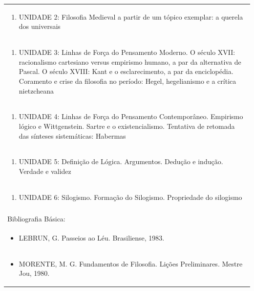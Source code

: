 \documentclass[11pt]{article}
\begin{document}
\begin{center}
\begin{longtable}{|p{4cm}|p{4cm}|p{4cm}|p{4cm}|}
\multicolumn{4}{|p{\dimexpr 16cm + 6\tabcolsep\relax}|}{\begin{enumerate}[start=2]\item UNIDADE 2: Filosofia Medieval a partir de um tópico exemplar: a querela dos universais\end{enumerate}}\\
\multicolumn{4}{|p{\dimexpr 16cm + 6\tabcolsep\relax}|}{\begin{enumerate}[start=3]\item UNIDADE 3: Linhas de Força do Pensamento Moderno. O século XVII: racionalismo cartesiano versus empirismo humano, a par da alternativa de Pascal. O século XVIII: Kant e o esclarecimento, a par da enciclopédia. Coramento e crise da filosofia no período: Hegel, hegelianismo e a crítica nietzcheana\end{enumerate}}\\
\multicolumn{4}{|p{\dimexpr 16cm + 6\tabcolsep\relax}|}{\begin{enumerate}[start=4]\item UNIDADE 4: Linhas de Força do Pensamento Contemporâneo. Empirismo lógico e Wittgenstein. Sartre e o existencialismo. Tentativa de retomada das sínteses sistemáticas: Habermas\end{enumerate}}\\
\multicolumn{4}{|p{\dimexpr 16cm + 6\tabcolsep\relax}|}{\begin{enumerate}[start=5]\item UNIDADE 5: Definição de Lógica. Argumentos. Dedução e indução. Verdade e validez\end{enumerate}}\\
\multicolumn{4}{|p{\dimexpr 16cm + 6\tabcolsep\relax}|}{\begin{enumerate}[start=6]\item UNIDADE 6: Silogismo. Formação do Silogismo. Propriedade do silogismo\end{enumerate}}\\
\multicolumn{4}{|p{\dimexpr 16cm + 6\tabcolsep\relax}|}{}\\
\hline
\multicolumn{4}{|p{16cm}|}{Bibliografia Básica:}\\*
\multicolumn{4}{|p{\dimexpr 16cm + 6\tabcolsep\relax}|}{\begin{itemize}\item LEBRUN, G. Passeios ao Léu. Brasiliense, 1983.\end{itemize}}\\
\multicolumn{4}{|p{\dimexpr 16cm + 6\tabcolsep\relax}|}{\begin{itemize}\item MORENTE, M. G. Fundamentos de Filosofia. Lições Preliminares. Mestre Jou, 1980.\end{itemize}}\\

\end{longtable}
\end{center}
\end{document}
